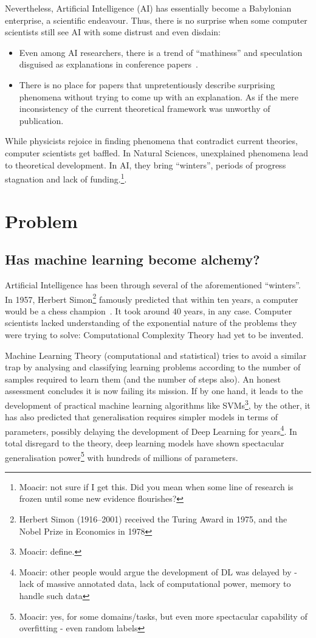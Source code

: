 Nevertheless, Artificial Intelligence (AI) has essentially become a Babylonian enterprise, a scientific endeavour. Thus, there is no surprise when some computer scientists still see AI with some distrust and even disdain:
\begin{itemize}
	\item Even among AI researchers, there is a trend of ``mathiness'' and speculation disguised as explanations in conference papers~\cite{lipton:2018}.
	\item There is no place for papers that unpretentiously describe surprising phenomena without trying to come up with an explanation. As if the mere inconsistency of the current theoretical framework was unworthy of publication.
\end{itemize}

While physicists rejoice in finding phenomena that contradict current theories, computer scientists get baffled. In Natural Sciences, unexplained phenomena lead to theoretical development. In AI, they bring ``winters'', periods of progress stagnation and lack of funding.\footnote{Moacir: not sure if I get this. Did you mean when some line of research is frozen until some new evidence flourishes?}.


\section{Problem}

\subsection{Has machine learning become alchemy?} Artificial Intelligence has been through several of the aforementioned ``winters''.  In 1957, Herbert Simon\footnote{Herbert Simon (1916--2001) received the Turing Award in 1975, and the Nobel Prize in Economics in 1978} famously predicted that within ten years, a computer would be a chess champion~\cite[section 1.3]{russell:2010}. It took around 40 years, in any case. Computer scientists lacked understanding of the exponential nature of the problems they were trying to solve: Computational Complexity Theory had yet to be invented.

Machine Learning Theory (computational and statistical) tries to avoid a similar trap by analysing and classifying learning problems according to the number of samples required to learn them (and the number of steps also). An honest assessment concludes it is now failing its mission. If by one hand, it leads to the development of practical machine learning algorithms like \acfp{SVM}\footnote{Moacir: define.}, by the other, it has also predicted that generalisation requires simpler models in terms of parameters, possibly delaying the development of Deep Learning for years\footnote{Moacir: other people would argue the development of DL was delayed by - lack of massive annotated data, lack of computational power, memory to handle such data}. In total disregard to the theory, deep learning models have shown spectacular generalisation power\footnote{Moacir: yes, for some domains/tasks, but even more spectacular capability of overfitting - even random labels} with hundreds of millions of parameters.


